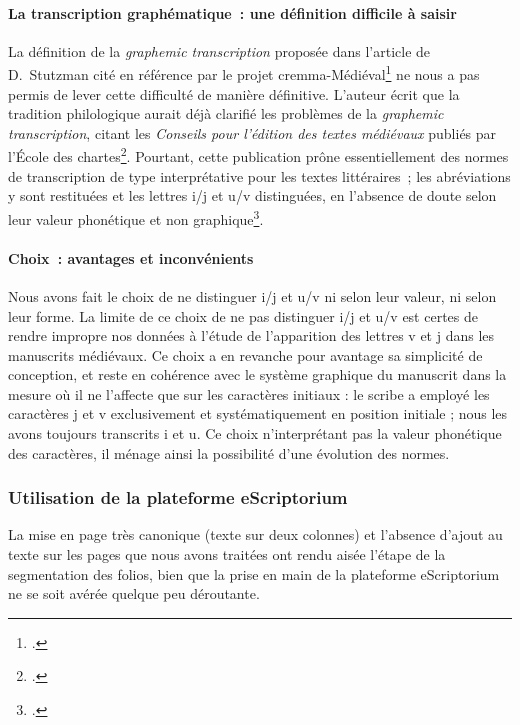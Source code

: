 \documentclass{article}
\begin{document}
\paragraph{La transcription graphématique~: une définition difficile à saisir}
La définition de la \textit{graphemic transcription} proposée dans l'article de D.~Stutzman cité en référence par le projet \gls{cremma}-Médiéval\footcite[p.~251]{stutzmannPaleographieStatistiquePour2011} ne nous a pas permis de lever cette difficulté de manière définitive. L'auteur écrit que la tradition philologique aurait déjà clarifié les problèmes de la \textit{graphemic transcription}, citant les \textit{Conseils pour l'édition des textes médiévaux} publiés par l'École des chartes\footcite{ecolenationaledeschartesConseilsPourEdition2001a}. Pourtant, cette publication prône essentiellement des normes de transcription de type interprétative pour les textes littéraires~; les abréviations y sont restituées et les lettres i/j et u/v distinguées, en l'absence de doute selon leur valeur phonétique et non graphique\footcite[fasc. 1, p.~23 et suivantes, ainsi que 31 pour les abréviations]{ecolenationaledeschartesConseilsPourEdition2001a}.

\paragraph{Choix~: avantages et inconvénients}
Nous avons fait le choix de ne distinguer i/j et u/v ni selon leur valeur, ni selon leur forme. La limite de ce choix de ne pas distinguer i/j et u/v est certes de rendre impropre nos données à l'étude de l'apparition des lettres v et j dans les manuscrits médiévaux. Ce choix a en revanche pour avantage sa simplicité de conception, et reste en cohérence avec le système graphique du manuscrit dans la mesure où il ne l'affecte que sur les caractères initiaux : le scribe a employé les caractères j et v exclusivement et systématiquement en position initiale ; nous les avons toujours transcrits i et u. Ce choix n'interprétant pas la valeur phonétique des caractères, il ménage ainsi la possibilité d'une évolution des normes.

\subsubsection{Utilisation de la plateforme eScriptorium}
La mise en page très canonique (texte sur deux colonnes) et l'absence d'ajout au texte sur les pages que nous avons traitées ont rendu aisée l'étape de la segmentation des folios, bien que la prise en main de la plateforme eScriptorium ne se soit avérée quelque peu déroutante.
\end{document}
